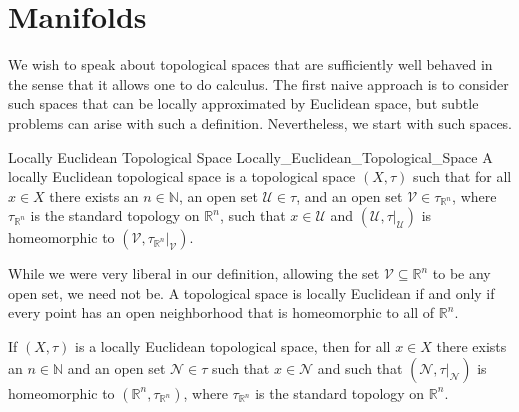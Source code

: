 \section{Manifolds}
    We wish to speak about topological spaces that are sufficiently well behaved
    in the sense that it allows one to do calculus. The first naive approach is
    to consider such spaces that can be locally approximated by Euclidean space,
    but subtle problems can arise with such a definition. Nevertheless, we start
    with such spaces.
    \begin{fdefinition}{Locally Euclidean Topological Space}
                       {Locally_Euclidean_Topological_Space}
        A locally Euclidean topological space is a topological space $(X,\tau)$
        such that for all $x\in{X}$ there exists an $n\in\mathbb{N}$, an open
        set $\mathcal{U}\in\tau$, and an open set
        $\mathcal{V}\in\tau_{\mathbb{R}^{n}}$, where $\tau_{\mathbb{R}^{n}}$ is
        the standard topology on $\mathbb{R}^{n}$, such that $x\in\mathcal{U}$
        and $(\mathcal{U},\tau|_{\mathcal{U}})$ is homeomorphic to
        $(\mathcal{V},\tau_{\mathbb{R}^{n}}|_{\mathcal{V}})$.
    \end{fdefinition}
    While we were very liberal in our definition, allowing the set
    $\mathcal{V}\subseteq\mathbb{R}^{n}$ to be any open set, we need not be.
    A topological space is locally Euclidean if and only if every point has an
    open neighborhood that is homeomorphic to all of $\mathbb{R}^{n}$.
    \begin{theorem}
        If $(X,\tau)$ is a locally Euclidean topological space, then for all
        $x\in{X}$ there exists an $n\in\mathbb{N}$ and an open set
        $\mathcal{N}\in\tau$ such that $x\in\mathcal{N}$ and such that
        $(\mathcal{N},\tau|_{\mathcal{N}})$ is homeomorphic to
        $(\mathbb{R}^{n},\tau_{\mathbb{R}^{n}})$, where $\tau_{\mathbb{R}^{n}}$
        is the standard topology on $\mathbb{R}^{n}$.
    \end{theorem}
